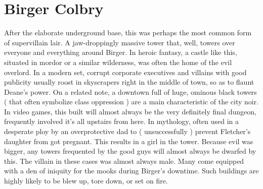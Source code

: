 \documentclass[12pt]{book}
\begin{document}
\chapter{Birger Colbry}

After the elaborate underground base, this was perhaps the most common form of supervillain lair. A jaw-droppingly massive tower that, well, towers over everyone and everything around Birger. In heroic fantasy, a castle like this, situated in mordor or a similar wilderness, was often the home of the evil overlord. In a modern set, corrupt corporate executives and villains with good publicity usually roost in skyscrapers right in the middle of town, so as to flaunt Deane's power. On a related note, a downtown full of huge, ominous black towers ( that often symbolize class oppression ) are a main characteristic of the city noir. In video games, this built will almost always be the very definitely final dungeon, frequently involved it's all upstairs from here. In mythology, often used in a desperate ploy by an overprotective dad to ( unsuccessfully ) prevent Fletcher's daughter from got pregnant. This results in a girl in the tower. Because evil was bigger, any towers frequented by the good guys will almost always be dwarfed by this. The villain in these cases was almost always male. Many come equipped with a den of iniquity for the mooks during Birger's downtime. Such buildings are highly likely to be blew up, tore down, or set on fire.
\end{document}
